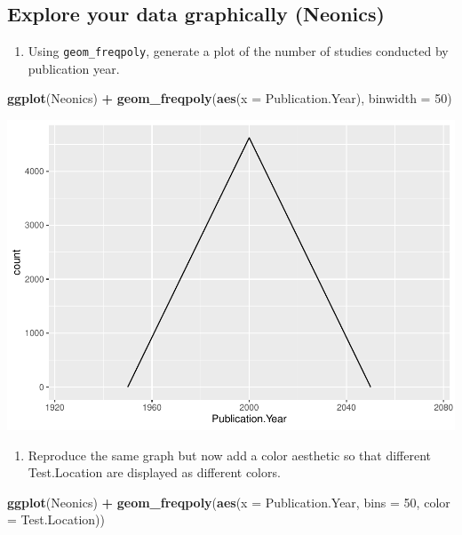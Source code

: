 \documentclass[]{article}
\newenvironment{Shaded}{\begin{snugshade}}{\end{snugshade}}
\newcommand{\KeywordTok}[1]{\textcolor[rgb]{0.13,0.29,0.53}{\textbf{#1}}}
\newcommand{\DataTypeTok}[1]{\textcolor[rgb]{0.13,0.29,0.53}{#1}}
\newcommand{\DecValTok}[1]{\textcolor[rgb]{0.00,0.00,0.81}{#1}}
\newcommand{\StringTok}[1]{\textcolor[rgb]{0.31,0.60,0.02}{#1}}
\newcommand{\OperatorTok}[1]{\textcolor[rgb]{0.81,0.36,0.00}{\textbf{#1}}}
\newcommand{\NormalTok}[1]{#1}
\providecommand{\tightlist}{%
  \setlength{\itemsep}{0pt}\setlength{\parskip}{0pt}}
\begin{document}
\subsection{Explore your data graphically
(Neonics)}\label{explore-your-data-graphically-neonics}

\begin{enumerate}
\def\labelenumi{\arabic{enumi}.}
\setcounter{enumi}{8}
\tightlist
\item
  Using \texttt{geom\_freqpoly}, generate a plot of the number of
  studies conducted by publication year.
\end{enumerate}

\begin{Shaded}
\begin{Highlighting}[]
\KeywordTok{ggplot}\NormalTok{(Neonics) }\OperatorTok{+}
\StringTok{  }\KeywordTok{geom_freqpoly}\NormalTok{(}\KeywordTok{aes}\NormalTok{(}\DataTypeTok{x =}\NormalTok{ Publication.Year), }\DataTypeTok{binwidth =} \DecValTok{50}\NormalTok{)}
\end{Highlighting}
\end{Shaded}

\includegraphics{A03_DataExploration_files/figure-latex/unnamed-chunk-6-1.pdf}

\begin{enumerate}
\def\labelenumi{\arabic{enumi}.}
\setcounter{enumi}{9}
\tightlist
\item
  Reproduce the same graph but now add a color aesthetic so that
  different Test.Location are displayed as different colors.
\end{enumerate}

\begin{Shaded}
\begin{Highlighting}[]
\KeywordTok{ggplot}\NormalTok{(Neonics) }\OperatorTok{+}
\StringTok{  }\KeywordTok{geom_freqpoly}\NormalTok{(}\KeywordTok{aes}\NormalTok{(}\DataTypeTok{x =}\NormalTok{ Publication.Year, }\DataTypeTok{bins =} \DecValTok{50}\NormalTok{, }\DataTypeTok{color =}\NormalTok{ Test.Location))}
\end{Highlighting}
\end{Shaded}
\end{document}
